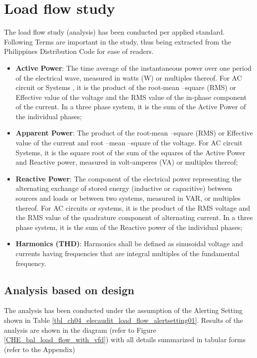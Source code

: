 %
\section{Load flow study} \label{ch04_elecaudit_loadflow}
The load flow study (analysis) has been conducted per applied standard. Following Terms are important in the study, thus being extracted from the Philippines Distribution Code for ease of readers.

\begin{itemize}
\item \textbf{Active Power}: The time average of the instantaneous power over one period of the electrical wave, measured in watts  (W) or multiples thereof. For AC circuit or Systems , it is the product of the root-mean –square (RMS) or Effective value of the voltage and the RMS value of the in-phase component of the current. In a three phase system, it is the sum of the Active Power of the individual phases;

\item \textbf{Apparent Power}: The product of the root-mean –square (RMS) or  Effective value of the current and root 	–mean –square of the voltage. For AC circuit Systems, it is the square root of the sum of the squares of the Active Power and Reactive power, measured in volt-amperes (VA) or multiples thereof;


\item \textbf{Reactive Power}: The component of the electrical power representing the alternating exchange of stored energy  (inductive or capacitive) between sources and loads or between two systems, measured in VAR, or multiples thereof. For AC circuits or systems, it is the product of the RMS voltage and the RMS value of the quadrature component of alternating current. In a three phase system, it is the sum of the Reactive power of the individual phases;


\item \textbf{Harmonics (THD)}: Harmonics shall be defined as sinusoidal voltage and currents having frequencies that are integral multiples of the fundamental frequency.

\end{itemize}

\subsection{Analysis based on design}
The analysis has been conducted under the assumption of the Alerting Setting shown in Table \ref{tbl_ch04_elecaudit_load_flow_alertsetting01}. Results of the analysis are shown in the diagram (refer to Figure \ref{CHE_bal_load_flow_with_vfd}) with all details summarized in tabular forms (refer to the Appendix)

